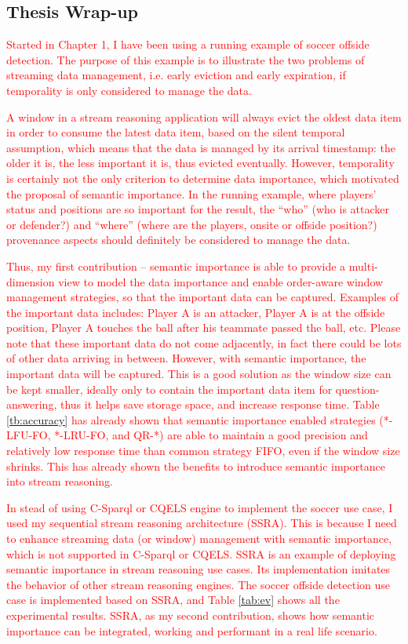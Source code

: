 \subsection{Thesis Wrap-up}
\textcolor{red}{
Started in Chapter 1, I have been using a running example of soccer offside detection.
The purpose of this example is to illustrate the two problems of streaming data management, i.e. early eviction and early expiration, if temporality is only considered to manage the data.
}

\textcolor{red}{
A window in a stream reasoning application will always evict the oldest data item in order to consume the latest data item, based on the silent temporal assumption, which means that the data is managed by its arrival timestamp: the older it is, the less important it is, thus evicted eventually. 
However, temporality is certainly not the only criterion to determine data importance, which motivated the proposal of semantic importance. 
In the running example, where players' status and positions are so important for the result, the ``who'' (who is attacker or defender?) and ``where'' (where are the players, onsite or offside position?) provenance aspects should definitely be considered to manage the data. 
}

\textcolor{red}{
Thus, my first contribution -- semantic importance is able to provide a multi-dimension view to model the data importance and enable order-aware window management strategies, so that the important data can be captured.
Examples of the important data includes: Player A is an attacker, Player A is at the offside position, Player A touches the ball after his teammate passed the ball, etc. 
Please note that these important data do not come adjacently, in fact there could be lots of other data arriving in between.
However, with semantic importance, the important data will be captured.
This is a good solution as the window size can be kept smaller, ideally only to contain the important data item for question-answering, thus it helps save storage space, and increase response time.
Table \ref{tb:accuracy} has already shown that semantic importance enabled strategies (*-LFU-FO, *-LRU-FO, and QR-*) are able to maintain a good precision and relatively low response time than common strategy FIFO, even if the window size shrinks.
This has already shown the benefits to introduce semantic importance into stream reasoning. 
}

\textcolor{red}{
In stead of using C-Sparql or CQELS engine to implement the soccer use case, I used my sequential stream reasoning architecture (SSRA).
This is because I need to enhance streaming data (or window) management with semantic importance, which is not supported in C-Sparql or CQELS. 
SSRA is an example of deploying semantic importance in stream reasoning use cases. 
Its implementation imitates the behavior of other stream reasoning engines.
The soccer offside detection use case is implemented based on SSRA, and Table \ref{tab:ev} shows all the experimental results.
SSRA, as my second contribution, shows how semantic importance can be integrated, working and performant in a real life scenario. 
}

